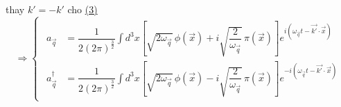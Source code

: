 \documentclass{report}
\begin{document}
thay $k'=-k'$ cho \hyperref[eq3]{(3)}
\begin{equation}
	\Rightarrow
	\begin{cases}
		\begin{aligned}
			a_{\vec{q}} &= \dfrac{1}{2(2\pi)^\frac{3}{2} }  \displaystyle \int d^3x \left[\sqrt{2\omega_{\vec{q}}}\,\phi(\vec{x}) + i\sqrt{\dfrac{2}{\omega_{\vec{q}}}}\,\pi(\vec{x})\right] e^{i(\omega_{\vec{q}}t - \vec{k'}\cdot\vec{x})}\\
			a_{\vec{q}}^{\dagger} &= \dfrac{1}{2(2\pi)^\frac{3}{2} }  \displaystyle \int d^3x \left[\sqrt{2\omega_{\vec{q}}}\,\phi(\vec{x}) - i\sqrt{\dfrac{2}{\omega_{\vec{q}}}}\,\pi(\vec{x})\right] e^{-i(\omega_{\vec{q}}t - \vec{k'}\cdot\vec{x})}
		\end{aligned}
	\end{cases}\nonumber
\end{equation}
\end{document}
